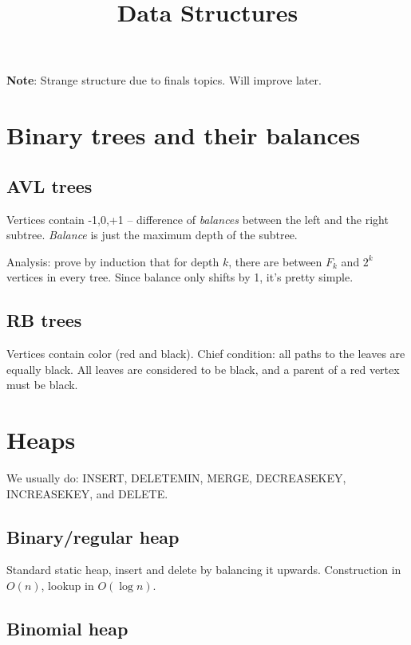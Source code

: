 

\begin{multicols}{3}

\def\len{{\rm len}}


\title{Data Structures}

{\bf Note}: Strange structure due to finals topics.
Will improve later.

\section{Binary trees and their balances}

\subsection{AVL trees}

Vertices contain {-1,0,+1} -- difference of {\it balances} between the left
and the right subtree. {\it Balance} is just the maximum depth of the subtree.

Analysis: prove by induction that for depth $k$, there are between $F_k$ and $2^k$
vertices in every tree. Since balance only shifts by 1, it's pretty simple.

\subsection{RB trees}

Vertices contain color (red and black). Chief condition: all paths to the leaves
are equally black. All leaves are considered to be black, and a parent of a red
vertex must be black.



\section{Heaps}

We usually do: INSERT, DELETEMIN, MERGE, DECREASEKEY, INCREASEKEY, and DELETE.

\subsection{Binary/regular heap}

Standard static heap, insert and delete by balancing it upwards.
Construction in $O(n)$, lookup in $O(\log n)$.

\subsection{Binomial heap}


\end{multicols}
